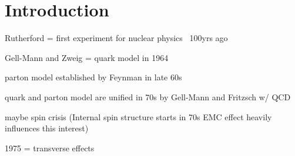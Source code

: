 \chapter{Introduction} \label{ch::intro}
\ifpdf
\graphicspath{{Chapters/Introduction/Figs/Raster/}{Chapters/Introduction/Figs/PDF/}{Chapters/Introduction/Figs/}}
\else \graphicspath{{Chapters/Introduction/Figs/Vector/}{Chapters/Introduction/Figs/}}
\fi

Rutherford = first experiment for nuclear physics ~100yrs ago

Gell-Mann and Zweig = quark model in 1964

parton model established by Feynman in late 60s

quark and parton model are unified in 70s by Gell-Mann and Fritzsch w/ QCD


maybe spin crisis
(Internal spin structure starts in 70s  EMC effect heavily influences this interest)


1975 = transverse effects





